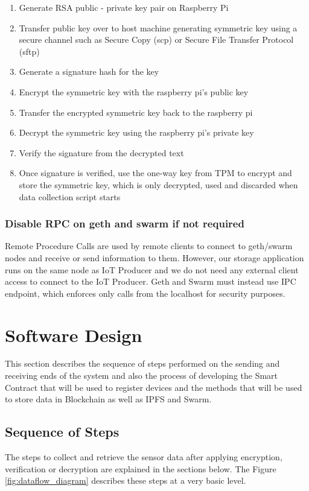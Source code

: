 \documentclass[11pt,openright]{report}
\begin{document}
\begin{enumerate}
	\item Generate RSA public - private key pair on Raspberry Pi
	\item Transfer public key over to host machine generating symmetric key using a secure channel such as Secure Copy (scp) or Secure File Transfer Protocol (sftp)
	\item Generate a signature hash for the key
	\item Encrypt the symmetric key with the raspberry pi's public key
	\item Transfer the encrypted symmetric key back to the raspberry pi
	\item Decrypt the symmetric key using the raspberry pi's private key
	\item Verify the signature from the decrypted text
	\item Once signature is verified, use the one-way key from TPM to encrypt and store the symmetric key, which is only decrypted, used and discarded when data collection script starts
\end{enumerate}

\subsubsection{Disable RPC on geth and swarm if not required}
Remote Procedure Calls are used by remote clients to connect to geth/swarm nodes and receive or send information to them. However, our storage application runs on the same node as IoT Producer and we do not need any external client access to connect to the IoT Producer. Geth and Swarm must instead use IPC endpoint, which enforces only calls from the localhost for security purposes.


\section{Software Design} \label{ss:software_design}
This section describes the sequence of steps performed on the sending and receiving ends of the system and also the process of developing the Smart Contract that will be used to register devices and the methods that will be used to store data in Blockchain as well as IPFS and Swarm.

\subsection{Sequence of Steps}
The steps to collect and retrieve the sensor data after applying encryption, verification or decryption are explained in the sections below. The Figure \ref{fig:dataflow_diagram} describes these steps at a very basic level.
\end{document}
